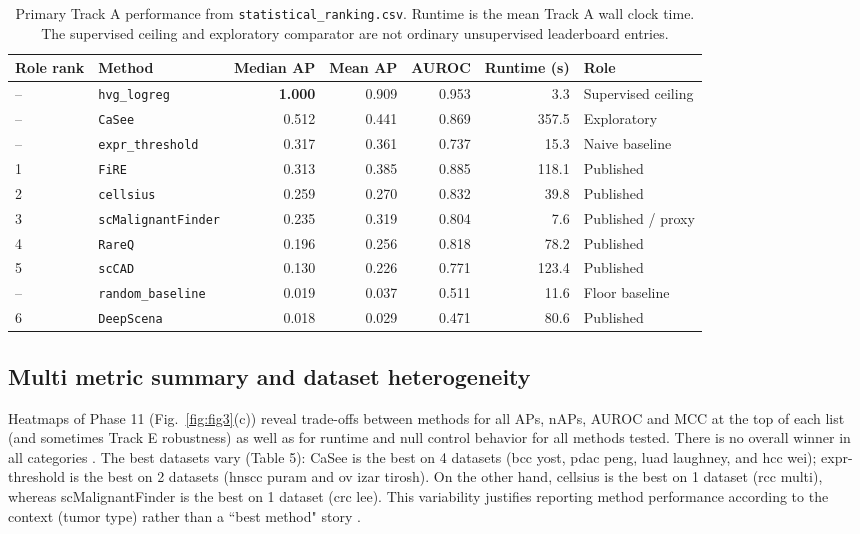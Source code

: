 \documentclass[10pt]{article}
\begin{document}
\begin{table}[H]
\centering
\caption{Primary Track A performance from \texttt{statistical\_ranking.csv}.
Runtime is the mean Track A wall clock time. The supervised ceiling and
exploratory comparator are not ordinary unsupervised leaderboard
entries.}
\label{tab:leaderboard}
\small
\begin{tabular}{llrrrrl}
\toprule
Role rank & Method & Median AP & Mean AP & AUROC & Runtime (s) & Role \\
\midrule
--   & \texttt{hvg\_logreg}        & \textbf{1.000} & 0.909 & 0.953 & 3.3   & Supervised ceiling \\
--   & \texttt{CaSee}              & 0.512          & 0.441 & 0.869 & 357.5 & Exploratory \\
--   & \texttt{expr\_threshold}    & 0.317          & 0.361 & 0.737 & 15.3  & Naive baseline \\
1    & \texttt{FiRE}               & 0.313          & 0.385 & 0.885 & 118.1 & Published \\
2    & \texttt{cellsius}           & 0.259          & 0.270 & 0.832 & 39.8  & Published \\
3    & \texttt{scMalignantFinder}  & 0.235          & 0.319 & 0.804 & 7.6   & Published / proxy \\
4    & \texttt{RareQ}              & 0.196          & 0.256 & 0.818 & 78.2  & Published \\
5    & \texttt{scCAD}              & 0.130          & 0.226 & 0.771 & 123.4 & Published \\
--   & \texttt{random\_baseline}   & 0.019          & 0.037 & 0.511 & 11.6  & Floor baseline \\
6    & \texttt{DeepScena}          & 0.018          & 0.029 & 0.471 & 80.6  & Published \\
\bottomrule
\end{tabular}
\end{table}

\subsection{Multi metric summary and dataset heterogeneity}

 Heatmaps of Phase 11 (Fig.~\ref{fig:fig3}(c)) reveal trade-offs between methods for all APs, nAPs, AUROC and MCC at the top of each list (and sometimes Track E robustness) as well as for runtime and null control behavior for all methods tested. There is no overall winner in all categories \cite{wang2022comparison,brendel2022application}. The best datasets vary (Table 5): CaSee is the best on 4 datasets (bcc yost, pdac peng, luad laughney, and hcc wei); expr-threshold is the best on 2 datasets (hnscc puram and ov izar tirosh). On the other hand, cellsius is the best on 1 dataset (rcc multi), whereas scMalignantFinder is the best on 1 dataset (crc lee). This variability justifies reporting method performance according to the context (tumor type) rather than a ``best method" story \cite{peng2019single,qian2020pan,tirosh2024cancer}.
\end{document}

